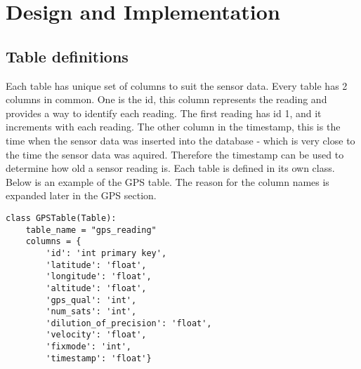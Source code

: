 \section{Design and Implementation}

\subsection{Table definitions}
Each table has unique set of columns to suit the sensor data.
Every table has 2 columns in common. One is the id, this column represents the reading and provides a way to identify each reading. The first reading has id 1, and it increments with each reading. The other column in the timestamp, this is the time when the sensor data was inserted into the database - which is very close to the time the sensor data was aquired. Therefore the timestamp can be used to determine how old a sensor reading is.
\newline
Each table is defined in its own class.
Below is an example of the GPS table. The reason for the column names is expanded later in the GPS section.
\begin{lstlisting}
class GPSTable(Table):
    table_name = "gps_reading"
    columns = {
        'id': 'int primary key',
        'latitude': 'float',
        'longitude': 'float',
        'altitude': 'float',
        'gps_qual': 'int',
        'num_sats': 'int',
        'dilution_of_precision': 'float',
        'velocity': 'float',
        'fixmode': 'int',
        'timestamp': 'float'}
\end{lstlisting}


